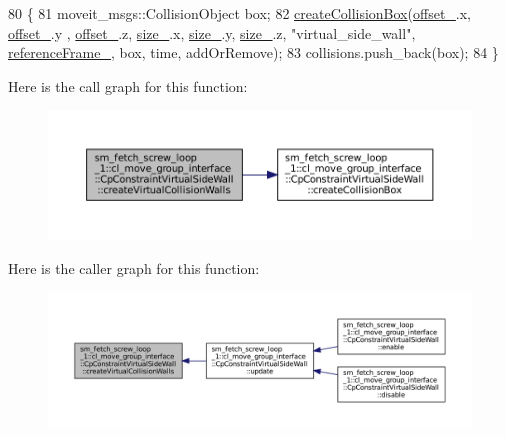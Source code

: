 \begin{DoxyCode}
80         \{
81             moveit\_msgs::CollisionObject box;
82             \hyperlink{classsm__fetch__screw__loop__1_1_1cl__move__group__interface_1_1CpConstraintVirtualSideWall_a57a9d6a1149ded198943c69fedc567fc}{createCollisionBox}(\hyperlink{classsm__fetch__screw__loop__1_1_1cl__move__group__interface_1_1CpConstraintVirtualSideWall_a2bb600f30ac245821b733051f67ff1f5}{offset\_}.x, \hyperlink{classsm__fetch__screw__loop__1_1_1cl__move__group__interface_1_1CpConstraintVirtualSideWall_a2bb600f30ac245821b733051f67ff1f5}{offset\_}.y , 
      \hyperlink{classsm__fetch__screw__loop__1_1_1cl__move__group__interface_1_1CpConstraintVirtualSideWall_a2bb600f30ac245821b733051f67ff1f5}{offset\_}.z, \hyperlink{classsm__fetch__screw__loop__1_1_1cl__move__group__interface_1_1CpConstraintVirtualSideWall_ab495461dac422e249302ec9be8e9e17a}{size\_}.x, \hyperlink{classsm__fetch__screw__loop__1_1_1cl__move__group__interface_1_1CpConstraintVirtualSideWall_ab495461dac422e249302ec9be8e9e17a}{size\_}.y, \hyperlink{classsm__fetch__screw__loop__1_1_1cl__move__group__interface_1_1CpConstraintVirtualSideWall_ab495461dac422e249302ec9be8e9e17a}{size\_}.z, \textcolor{stringliteral}{"virtual\_side\_wall"}, 
      \hyperlink{classsm__fetch__screw__loop__1_1_1cl__move__group__interface_1_1CpConstraintVirtualSideWall_af0f1ec5b78685c0c4a45906aca85219e}{referenceFrame\_}, box, time, addOrRemove);
83             collisions.push\_back(box);
84         \}
\end{DoxyCode}
Here is the call graph for this function\+:
\nopagebreak
\begin{figure}[H]
\begin{center}
\leavevmode
\includegraphics[width=350pt]{classsm__fetch__screw__loop__1_1_1cl__move__group__interface_1_1CpConstraintVirtualSideWall_acbe325c0c6fb25e10efddb9be7e672d1_cgraph}
\end{center}
\end{figure}
Here is the caller graph for this function\+:
\nopagebreak
\begin{figure}[H]
\begin{center}
\leavevmode
\includegraphics[width=350pt]{classsm__fetch__screw__loop__1_1_1cl__move__group__interface_1_1CpConstraintVirtualSideWall_acbe325c0c6fb25e10efddb9be7e672d1_icgraph}
\end{center}
\end{figure}
